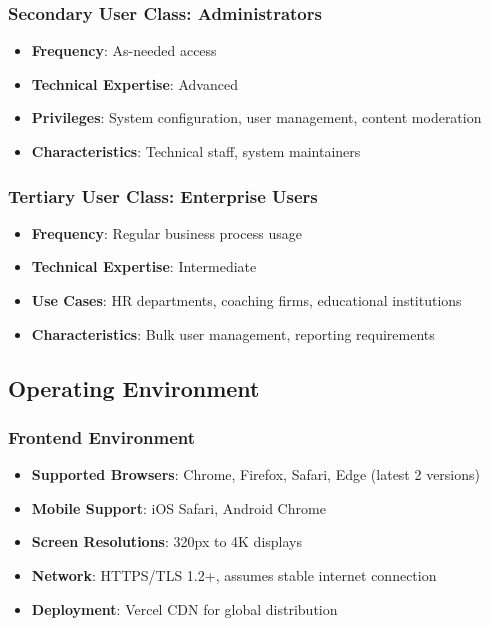 \documentclass[12pt,a4paper]{article}
\begin{document}
\subsubsection{Secondary User Class: Administrators}
\begin{itemize}
    \item \textbf{Frequency}: As-needed access
    \item \textbf{Technical Expertise}: Advanced
    \item \textbf{Privileges}: System configuration, user management, content moderation
    \item \textbf{Characteristics}: Technical staff, system maintainers
\end{itemize}

\subsubsection{Tertiary User Class: Enterprise Users}
\begin{itemize}
    \item \textbf{Frequency}: Regular business process usage
    \item \textbf{Technical Expertise}: Intermediate
    \item \textbf{Use Cases}: HR departments, coaching firms, educational institutions
    \item \textbf{Characteristics}: Bulk user management, reporting requirements
\end{itemize}

\subsection{Operating Environment}

\subsubsection{Frontend Environment}
\begin{itemize}
    \item \textbf{Supported Browsers}: Chrome, Firefox, Safari, Edge (latest 2 versions)
    \item \textbf{Mobile Support}: iOS Safari, Android Chrome
    \item \textbf{Screen Resolutions}: 320px to 4K displays
    \item \textbf{Network}: HTTPS/TLS 1.2+, assumes stable internet connection
    \item \textbf{Deployment}: Vercel CDN for global distribution
\end{itemize}
\end{document}
